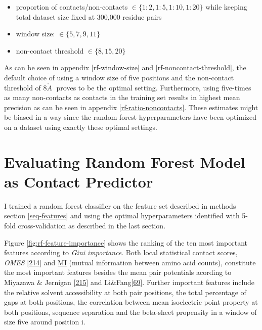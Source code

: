 \documentclass[11pt,a4paper,twoside]{book}
\providecommand{\tightlist}{%
  \setlength{\itemsep}{0pt}\setlength{\parskip}{0pt}}
\newcommand{\angstrom}{\mathring{A} \;}
\theoremstyle{definition}
\theoremstyle{definition}
\theoremstyle{remark}
\begin{document}
\begin{itemize}
\tightlist
\item
  proportion of contacts/non-contacts
  \(\in \{1\!:\!2, 1\!:\!5, 1\!:\!10, 1\!:\!20 \}\) while keeping total
  dataset size fixed at 300,000 residue pairs
\item
  window size: \(\in \{5, 7, 9, 11\}\)
\item
  non-contact threshold \(\in \{8, 15, 20\}\)
\end{itemize}

As can be seen in appendix \ref{rf-window-size} and
\ref{rf-noncontact-threshold}, the default choice of using a window size
of five positions and the non-contact threshold of \(8 \angstrom\)
proves to be the optimal setting. Furthermore, using five-times as many
non-contacts as contacts in the training set results in highest mean
precision as can be seen in appendix \ref{rf-ratio-noncontacts}. These
estimates might be biased in a way since the random forest
hyperparameters have been optimized on a dataset using exactly these
optimal settings.

\section{Evaluating Random Forest Model as Contact
Predictor}\label{evaluating-random-forest-model-as-contact-predictor}

I trained a random forest classifier on the feature set described in
methods section \ref{seq-features} and using the optimal hyperparameters
identified with 5-fold cross-validation as described in the last
section.

Figure \ref{fig:rf-feature-importance} shows the ranking of the ten most
important features according to \emph{Gini importance}. Both local
statistical contact scores, \emph{OMES}
{[}\protect\hyperlink{ref-Fodor2004a}{214}{]} and
\protect\hyperlink{abbrev}{MI} (mutual information between amino acid
counts), constitute the most important features besides the mean pair
potentials acording to Miyazawa \& Jernigan
{[}\protect\hyperlink{ref-Miyazawa1999a}{215}{]} and
Li\&Fang{[}\protect\hyperlink{ref-Li2011}{69}{]}. Further important
features include the relative solvent accessibility at both pair
positions, the total percentage of gaps at both positions, the
correlation between mean isoelectric point property at both positions,
sequence separation and the beta-sheet propensity in a window of size
five around position i.
\end{document}
